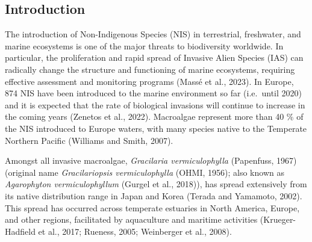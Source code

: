 \documentclass[
  letterpaper,
  11pt,
  english,
  singlespacing,
  headsepline]{MastersDoctoralThesis}
\newcommand{\startonrightwithgap}{%
  \clearpage
  \ifodd\value{page}
    \thispagestyle{empty}\mbox{}\clearpage
    \thispagestyle{empty}\mbox{}\clearpage
  \else
    \thispagestyle{empty}\mbox{}\clearpage
  \fi
}
\begin{document}
\begin{spacing}{1.5}
\startonrightwithgap

\section{Introduction}\label{introduction-3}

The introduction of Non-Indigenous Species (NIS) in terrestrial,
freshwater, and marine ecosystems is one of the major threats to
biodiversity worldwide. In particular, the proliferation and rapid
spread of Invasive Alien Species (IAS) can radically change the
structure and functioning of marine ecosystems, requiring effective
assessment and monitoring programs (Massé et al., 2023). In Europe, 874
NIS have been introduced to the marine environment so far (i.e.~until
2020) and it is expected that the rate of biological invasions will
continue to increase in the coming years (Zenetos et al., 2022).
Macroalgae represent more than 40 \% of the NIS introduced to Europe
waters, with many species native to the Temperate Northern Pacific
(Williams and Smith, 2007).

Amongst all invasive macroalgae, \emph{Gracilaria vermiculophylla}
(Papenfuss, 1967) (original name \emph{Gracilariopsis vermiculophylla}
(OHMI, 1956); also known as \emph{Agarophyton vermiculophyllum} (Gurgel
et al., 2018)), has spread extensively from its native distribution
range in Japan and Korea (Terada and Yamamoto, 2002). This spread has
occurred across temperate estuaries in North America, Europe, and other
regions, facilitated by aquaculture and maritime activities
(Krueger-Hadfield et al., 2017; Rueness, 2005; Weinberger et al., 2008).


\end{spacing}
\end{document}
